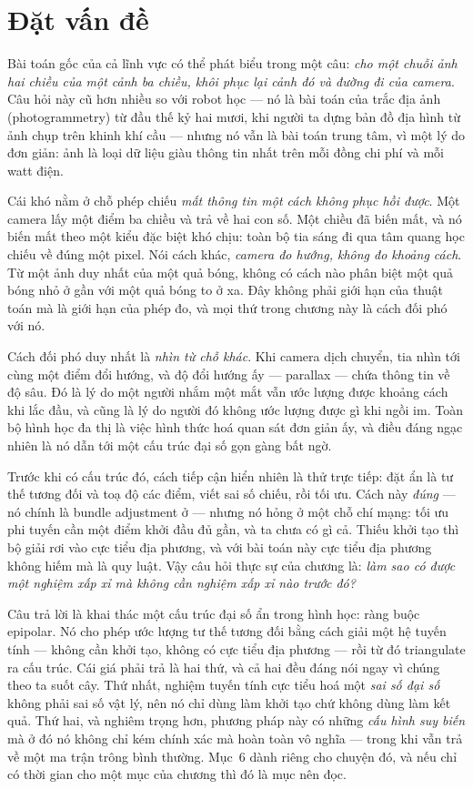 \documentclass[../../vslam.tex]{subfiles}
\begin{document}
\section{Đặt vấn đề}

Bài toán gốc của cả lĩnh vực có thể phát biểu trong một câu: \emph{cho một chuỗi ảnh hai chiều của một cảnh ba chiều, khôi phục lại cảnh đó và đường đi của camera}. Câu hỏi này cũ hơn nhiều so với robot học --- nó là bài toán của trắc địa ảnh (photogrammetry) từ đầu thế kỷ hai mươi, khi người ta dựng bản đồ địa hình từ ảnh chụp trên khinh khí cầu --- nhưng nó vẫn là bài toán trung tâm, vì một lý do đơn giản: ảnh là loại dữ liệu giàu thông tin nhất trên mỗi đồng chi phí và mỗi watt điện.

Cái khó nằm ở chỗ phép chiếu \emph{mất thông tin một cách không phục hồi được}. Một camera lấy một điểm ba chiều và trả về hai con số. Một chiều đã biến mất, và nó biến mất theo một kiểu đặc biệt khó chịu: toàn bộ tia sáng đi qua tâm quang học chiếu về đúng một pixel. Nói cách khác, \emph{camera đo hướng, không đo khoảng cách}. Từ một ảnh duy nhất của một quả bóng, không có cách nào phân biệt một quả bóng nhỏ ở gần với một quả bóng to ở xa. Đây không phải giới hạn của thuật toán mà là giới hạn của phép đo, và mọi thứ trong chương này là cách đối phó với nó.

Cách đối phó duy nhất là \emph{nhìn từ chỗ khác}. Khi camera dịch chuyển, tia nhìn tới cùng một điểm đổi hướng, và độ đổi hướng ấy --- parallax --- chứa thông tin về độ sâu. Đó là lý do một người nhắm một mắt vẫn ước lượng được khoảng cách khi lắc đầu, và cũng là lý do người đó không ước lượng được gì khi ngồi im. Toàn bộ hình học đa thị là việc hình thức hoá quan sát đơn giản ấy, và điều đáng ngạc nhiên là nó dẫn tới một cấu trúc đại số gọn gàng bất ngờ.

Trước khi có cấu trúc đó, cách tiếp cận hiển nhiên là thử trực tiếp: đặt ẩn là tư thế tương đối và toạ độ các điểm, viết sai số chiếu, rồi tối ưu. Cách này \emph{đúng} --- nó chính là bundle adjustment ở  --- nhưng nó hỏng ở một chỗ chí mạng: tối ưu phi tuyến cần một điểm khởi đầu đủ gần, và ta chưa có gì cả. Thiếu khởi tạo thì bộ giải rơi vào cực tiểu địa phương, và với bài toán này cực tiểu địa phương không hiếm mà là quy luật. Vậy câu hỏi thực sự của chương là: \emph{làm sao có được một nghiệm xấp xỉ mà không cần nghiệm xấp xỉ nào trước đó?}

Câu trả lời là khai thác một cấu trúc đại số ẩn trong hình học: ràng buộc epipolar. Nó cho phép ước lượng tư thế tương đối bằng cách giải một hệ tuyến tính --- không cần khởi tạo, không có cực tiểu địa phương --- rồi từ đó triangulate ra cấu trúc. Cái giá phải trả là hai thứ, và cả hai đều đáng nói ngay vì chúng theo ta suốt cây. Thứ nhất, nghiệm tuyến tính cực tiểu hoá một \emph{sai số đại số} không phải sai số vật lý, nên nó chỉ dùng làm khởi tạo chứ không dùng làm kết quả. Thứ hai, và nghiêm trọng hơn, phương pháp này có những \emph{cấu hình suy biến} mà ở đó nó không chỉ kém chính xác mà hoàn toàn vô nghĩa --- trong khi vẫn trả về một ma trận trông bình thường. Mục~6 dành riêng cho chuyện đó, và nếu chỉ có thời gian cho một mục của chương thì đó là mục nên đọc.
\end{document}
